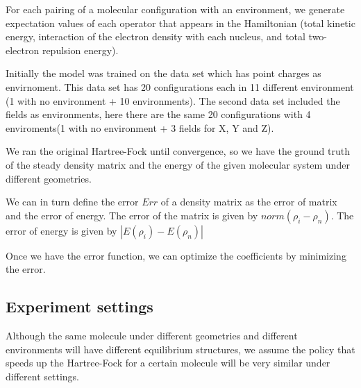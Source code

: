 \documentclass[twoside]{article}
\begin{document}




For each pairing of a molecular configuration with an environment, we generate expectation values of each operator that appears in the Hamiltonian (total kinetic energy, interaction of the electron density with each nucleus, and total two-electron repulsion energy).

Initially the model was trained on the data set which has point charges as envirnoment. This data set has 20 configurations each in 11 different environment (1 with no environment + 10 environments). The second data set included the fields as environments, here there are the same 20 configurations with 4 enviroments(1 with no environment + 3 fields for X, Y and Z). 

We ran the original Hartree-Fock until convergence, so we have the ground truth of the steady density matrix and the energy of the given molecular system under different geometries. 

We can in turn define the error $Err$ of a density matrix as the error of matrix and the error of energy. The error of the matrix is given by $norm(\rho_i-\rho_n)$. The error of energy is given by $|E(\rho_i)-E(\rho_n)|$

Once we have the error function, we can optimize the coefficients by minimizing the error.


\subsection{Experiment settings}


Although the same molecule under different geometries and different environments will have different equilibrium structures, we assume the policy that speeds up the Hartree-Fock for a certain molecule will be very similar under different settings. 
\end{document}
